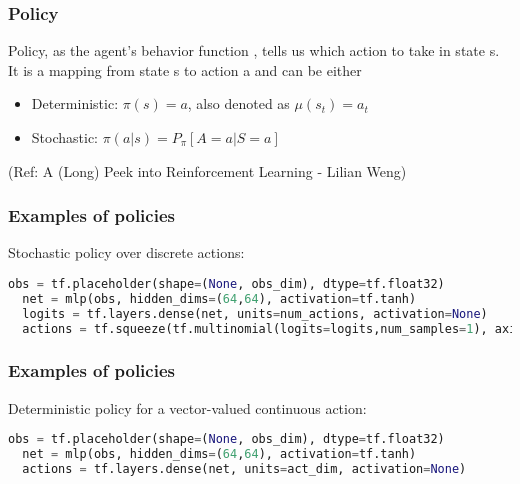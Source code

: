 \begin{frame}[fragile]\frametitle{Policy}

Policy, as the agent’s behavior function  , tells us which action to take in state s. It is a mapping from
state s to action a and can be either 

\begin{itemize}
\item Deterministic: $\pi(s)=a$, also denoted as $\mu(s_t)=a_t$
\item Stochastic: $\pi (a|s) = P_{\pi}[A=a|S=a]$
\end{itemize}


{\tiny (Ref: A (Long) Peek into Reinforcement Learning - Lilian Weng)}

\end{frame}

\begin{frame}[fragile]\frametitle{Examples of policies}

Stochastic policy over discrete actions:

\begin{lstlisting}[language=python]
  obs = tf.placeholder(shape=(None, obs_dim), dtype=tf.float32)
  net = mlp(obs, hidden_dims=(64,64), activation=tf.tanh)
  logits = tf.layers.dense(net, units=num_actions, activation=None)
  actions = tf.squeeze(tf.multinomial(logits=logits,num_samples=1), axis=1)
\end{lstlisting}




\end{frame}

\begin{frame}[fragile]\frametitle{Examples of policies}

Deterministic policy for a vector-valued continuous action:

\begin{lstlisting}[language=python]
  obs = tf.placeholder(shape=(None, obs_dim), dtype=tf.float32)
  net = mlp(obs, hidden_dims=(64,64), activation=tf.tanh)
  actions = tf.layers.dense(net, units=act_dim, activation=None)
\end{lstlisting}




\end{frame}

